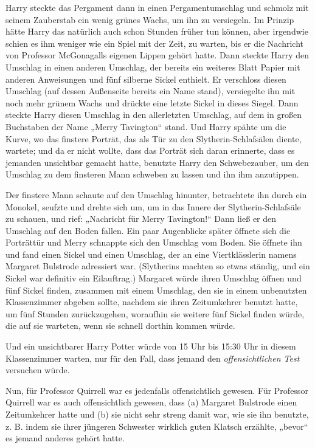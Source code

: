 {Harry steckte das Pergament dann in einen Pergamentumschlag und schmolz mit seinem Zauberstab ein wenig grünes Wachs, um ihn zu versiegeln. Im Prinzip hätte Harry das natürlich auch schon Stunden früher tun können, aber irgendwie schien es ihm weniger wie ein Spiel mit der Zeit, zu warten, bis er die Nachricht von Professor McGonagalls eigenen Lippen gehört hatte. Dann steckte Harry den Umschlag in einen anderen Umschlag, der bereits ein weiteres Blatt Papier mit anderen Anweisungen und fünf silberne Sickel enthielt. Er verschloss diesen Umschlag (auf dessen Außenseite bereits ein Name stand), versiegelte ihn mit noch mehr grünem Wachs und drückte eine letzte Sickel in dieses Siegel. Dann steckte Harry diesen Umschlag in den allerletzten Umschlag, auf dem in großen Buchstaben der Name „Merry Tavington“ stand. Und Harry spähte um die Kurve, wo das finstere Porträt, das als Tür zu den Slytherin-Schlafsälen diente, wartete; und da er nicht wollte, dass das Porträt sich daran erinnerte, dass es jemanden unsichtbar gemacht hatte, benutzte Harry den Schwebezauber, um den Umschlag zu dem finsteren Mann schweben zu lassen und ihn ihm anzutippen.

Der finstere Mann schaute auf den Umschlag hinunter, betrachtete ihn durch ein Monokel, seufzte und drehte sich um, um in das Innere der Slytherin-Schlafsäle zu schauen, und rief: „Nachricht für Merry Tavington!“ Dann ließ er den Umschlag auf den Boden fallen. Ein paar Augenblicke später öffnete sich die Porträttür und Merry schnappte sich den Umschlag vom Boden. Sie öffnete ihn und fand einen Sickel und einen Umschlag, der an eine Viertklässlerin namens Margaret Bulstrode adressiert war. (Slytherins machten so etwas ständig, und ein Sickel war definitiv ein Eilauftrag.) Margaret würde ihren Umschlag öffnen und fünf Sickel finden, zusammen mit einem Umschlag, den sie in einem unbenutzten Klassenzimmer abgeben sollte, nachdem sie ihren Zeitumkehrer benutzt hatte, um fünf Stunden zurückzugehen, woraufhin sie weitere fünf Sickel finden würde, die auf sie warteten, wenn sie schnell dorthin kommen würde.

Und ein unsichtbarer Harry Potter würde von 15 Uhr bis 15:30 Uhr in diesem Klassenzimmer warten, nur für den Fall, dass jemand den \emph{offensichtlichen Test} versuchen würde.

Nun, für Professor Quirrell war es jedenfalls offensichtlich gewesen. Für Professor Quirrell war es auch offensichtlich gewesen, dass (a) Margaret Bulstrode einen Zeitumkehrer hatte und (b) sie nicht sehr streng damit war, wie sie ihn benutzte, z. B. indem sie ihrer jüngeren Schwester wirklich guten Klatsch erzählte, „bevor“ es jemand anderes gehört hatte.

}
